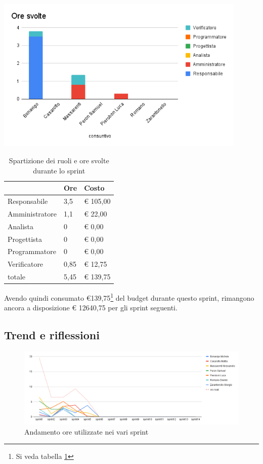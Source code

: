\begin{center}
\includegraphics[width=12cm]{img/ore-svolte.png}
\end{center}

\begin{table}[ht]
    \begin{tabularx}{\linewidth}{X|l|l}
    \rowcolor{gray!30}& Ore & Costo \\
    \hline
    
    Responsabile & 3,5 & € 105,00 \\
    \rowcolor{gray!10}Amministratore & 1,1 & € 22,00 \\
    Analista & 0 & € 0,00 \\
    \rowcolor{gray!10}Progettista & 0 & € 0,00 \\
    Programmatore & 0 & € 0,00 \\
    \rowcolor{gray!10}Verificatore & 0,85 &€ 12,75 \\
    totale & 5,45 & € 139,75 \\
    \end{tabularx}
    \caption{\label{costi-ruolo}Spartizione dei ruoli e ore svolte durante lo sprint}
\end{table}


Avendo quindi consumato €139,75\footnote{Si veda tabella \ref{costi-ruolo}} del budget durante questo sprint, rimangono ancora a disposizione € 12640,75 per gli sprint seguenti.

\subsection{Trend e riflessioni}

\begin{figure}[ht]
    \includegraphics[width=\linewidth]{img/andamento.png}
    \caption{Andamento ore utilizzate nei vari sprint}\label{img:andamento}
\end{figure}

